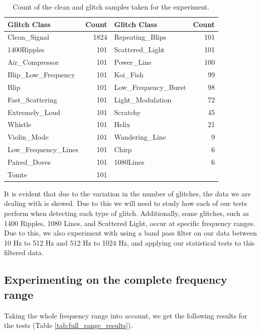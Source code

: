 \documentclass[12pt]{article}
\begin{document}
\begin{table}[H]
  \centering
  \begin{tabular}{lr|lr}
    \toprule
    Glitch Class & Count & Glitch Class & Count \\
    \midrule
    Clean\_Signal & 1824 & Repeating\_Blips & 101 \\
    1400Ripples & 101 & Scattered\_Light & 101 \\
    Air\_Compressor & 101 & Power\_Line & 100 \\
    Blip\_Low\_Frequency & 101 & Koi\_Fish & 99 \\
    Blip & 101 & Low\_Frequency\_Burst & 98 \\
    Fast\_Scattering & 101 & Light\_Modulation & 72 \\
    Extremely\_Loud & 101 & Scratchy & 45 \\
    Whistle & 101 & Helix & 21 \\
    Violin\_Mode & 101 & Wandering\_Line & 9 \\
    Low\_Frequency\_Lines & 101 & Chirp & 6 \\
    Paired\_Doves & 101 & 1080Lines & 6 \\
    Tomte & 101 \\
    \bottomrule
  \end{tabular}
  \caption{Count of the clean and glitch samples taken for the experiment.}
  \label{tab:label_counts}
\end{table}

\noindent It is evident that due to the variation in the number of glitches, the data we are dealing with is skewed. Due to this we will need to study how each of our tests perform when detecting each type of glitch. Additionally, some glitches, such as 1400 Ripples, 1080 Lines, and Scattered Light, occur at specific frequency ranges. Due to this, we also experiment with using a band pass filter on our data between 10 Hz to 512 Hz and 512 Hz to 1024 Hz, and applying our statistical tests to this filtered data.

\pagebreak

\subsection{Experimenting on the complete frequency range}\label{Experiment_1}

Taking the whole frequency range into account, we get the following results for the tests (Table \ref{tab:full_range_results}).
\end{document}
